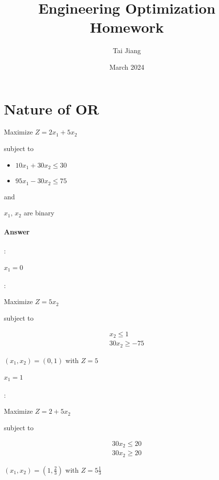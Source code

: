 \documentclass{article}
\title{Engineering Optimization Homework}
\author{Tai Jiang}
\date{March 2024}
\begin{document}
  \maketitle
  \section{Nature of OR}
  Maximize $Z = 2x_1 + 5x_2$

  
  subject to
  \begin{itemize}
    \item $10x_1 + 30x_2 \leq 30$
    \item $95x_1 - 30x_2 \leq 75$
  \end{itemize}

  and

  $x_1$, $x_2$ are binary
  
  \paragraph{Answer}:

  \paragraph{$x_1=0$}:

  Maximize $Z = 5x_2$

  subject to

  \begin{equation*}
    \begin{aligned}
      x_2 \leq 1 \\
      30x_2 \geq -75
    \end{aligned}
  \end{equation*}


  $(x_1, x_2) = (0, 1)$ with $Z=5$

  \paragraph{$x_1=1$}:

  Maximize $Z = 2 + 5x_2$

  subject to

  \begin{equation*}
    \begin{aligned}
      30x_2 \leq 20 \\
      30x_2 \geq 20
    \end{aligned}
  \end{equation*}

  $(x_1, x_2) = (1, \frac{2}{3})$ with $Z=5 \frac{1}{3}$
\end{document}
